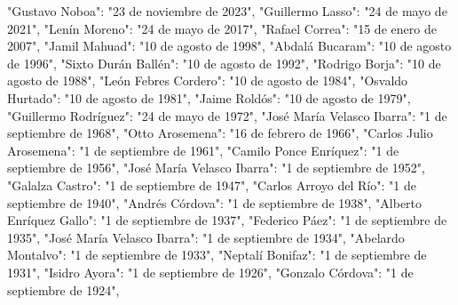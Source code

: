 \documentclass[
  a4paper,
  DIV=11,
  numbers=noendperiod,
  onepage,
  openany]{scrreprt}
\newenvironment{Shaded}{\begin{snugshade}}{\end{snugshade}}
\newcommand{\NormalTok}[1]{\textcolor[rgb]{0.00,0.23,0.31}{#1}}
\newcommand{\StringTok}[1]{\textcolor[rgb]{0.13,0.47,0.30}{#1}}
\begin{document}
\begin{tcolorbox}
\begin{Shaded}
\begin{Highlighting}[]
    \StringTok{"Gustavo Noboa"}\NormalTok{: }\StringTok{"23 de noviembre de 2023"}\NormalTok{,}
    \StringTok{"Guillermo Lasso"}\NormalTok{: }\StringTok{"24 de mayo de 2021"}\NormalTok{,}
    \StringTok{"Lenín Moreno"}\NormalTok{: }\StringTok{"24 de mayo de 2017"}\NormalTok{,}
    \StringTok{"Rafael Correa"}\NormalTok{: }\StringTok{"15 de enero de 2007"}\NormalTok{,}
    \StringTok{"Jamil Mahuad"}\NormalTok{: }\StringTok{"10 de agosto de 1998"}\NormalTok{,}
    \StringTok{"Abdalá Bucaram"}\NormalTok{: }\StringTok{"10 de agosto de 1996"}\NormalTok{,}
    \StringTok{"Sixto Durán Ballén"}\NormalTok{: }\StringTok{"10 de agosto de 1992"}\NormalTok{,}
    \StringTok{"Rodrigo Borja"}\NormalTok{: }\StringTok{"10 de agosto de 1988"}\NormalTok{,}
    \StringTok{"León Febres Cordero"}\NormalTok{: }\StringTok{"10 de agosto de 1984"}\NormalTok{,}
    \StringTok{"Osvaldo Hurtado"}\NormalTok{: }\StringTok{"10 de agosto de 1981"}\NormalTok{,}
    \StringTok{"Jaime Roldós"}\NormalTok{: }\StringTok{"10 de agosto de 1979"}\NormalTok{,}
    \StringTok{"Guillermo Rodríguez"}\NormalTok{: }\StringTok{"24 de mayo de 1972"}\NormalTok{,}
    \StringTok{"José María Velasco Ibarra"}\NormalTok{: }\StringTok{"1 de septiembre de 1968"}\NormalTok{,}
    \StringTok{"Otto Arosemena"}\NormalTok{: }\StringTok{"16 de febrero de 1966"}\NormalTok{,}
    \StringTok{"Carlos Julio Arosemena"}\NormalTok{: }\StringTok{"1 de septiembre de 1961"}\NormalTok{,}
    \StringTok{"Camilo Ponce Enríquez"}\NormalTok{: }\StringTok{"1 de septiembre de 1956"}\NormalTok{,}
    \StringTok{"José María Velasco Ibarra"}\NormalTok{: }\StringTok{"1 de septiembre de 1952"}\NormalTok{,}
    \StringTok{"Galalza Castro"}\NormalTok{: }\StringTok{"1 de septiembre de 1947"}\NormalTok{,}
    \StringTok{"Carlos Arroyo del Río"}\NormalTok{: }\StringTok{"1 de septiembre de 1940"}\NormalTok{,}
    \StringTok{"Andrés Córdova"}\NormalTok{: }\StringTok{"1 de septiembre de 1938"}\NormalTok{,}
    \StringTok{"Alberto Enríquez Gallo"}\NormalTok{: }\StringTok{"1 de septiembre de 1937"}\NormalTok{,}
    \StringTok{"Federico Páez"}\NormalTok{: }\StringTok{"1 de septiembre de 1935"}\NormalTok{,}
    \StringTok{"José María Velasco Ibarra"}\NormalTok{: }\StringTok{"1 de septiembre de 1934"}\NormalTok{,}
    \StringTok{"Abelardo Montalvo"}\NormalTok{: }\StringTok{"1 de septiembre de 1933"}\NormalTok{,}
    \StringTok{"Neptalí Bonifaz"}\NormalTok{: }\StringTok{"1 de septiembre de 1931"}\NormalTok{,}
    \StringTok{"Isidro Ayora"}\NormalTok{: }\StringTok{"1 de septiembre de 1926"}\NormalTok{,}
    \StringTok{"Gonzalo Córdova"}\NormalTok{: }\StringTok{"1 de septiembre de 1924"}\NormalTok{,}

\end{Highlighting}
\end{Shaded}
\end{tcolorbox}
\end{document}
